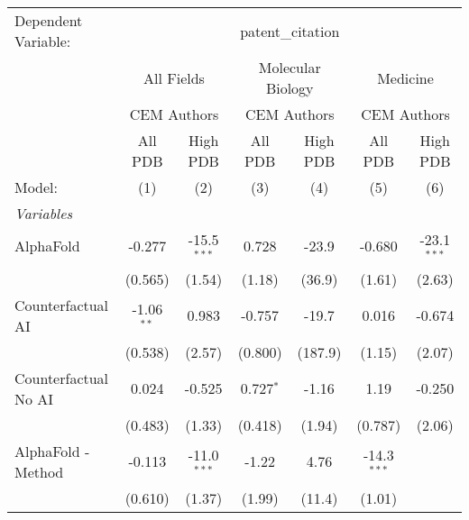 \begingroup
\centering
\begin{tabular}{lcccccc}
   \tabularnewline \midrule \midrule
   Dependent Variable: & \multicolumn{6}{c}{patent\_citation}\\
 & \multicolumn{2}{c}{All Fields} & \multicolumn{2}{c}{Molecular Biology} & \multicolumn{2}{c}{Medicine} \\
\cmidrule(lr){2-3} \cmidrule(lr){4-5} \cmidrule(lr){6-7}
 & \multicolumn{2}{c}{CEM Authors} & \multicolumn{2}{c}{CEM Authors} & \multicolumn{2}{c}{CEM Authors} \\
\cmidrule(lr){2-3} \cmidrule(lr){4-5} \cmidrule(lr){6-7}
 & \multicolumn{1}{c}{All PDB} & \multicolumn{1}{c}{High PDB} & \multicolumn{1}{c}{All PDB} & \multicolumn{1}{c}{High PDB} & \multicolumn{1}{c}{All PDB} & \multicolumn{1}{c}{High PDB} \\
\cmidrule(lr){2-2} \cmidrule(lr){3-3} \cmidrule(lr){4-4} \cmidrule(lr){5-5} \cmidrule(lr){6-6} \cmidrule(lr){7-7}
   Model:                                                     & (1)           & (2)           & (3)           & (4)     & (5)           & (6)\\  
   \midrule
   \emph{Variables}\\
   AlphaFold                                                  & -0.277        & -15.5$^{***}$ & 0.728         & -23.9   & -0.680        & -23.1$^{***}$\\   
                                                              & (0.565)       & (1.54)        & (1.18)        & (36.9)  & (1.61)        & (2.63)\\   
   Counterfactual AI                                          & -1.06$^{**}$  & 0.983         & -0.757        & -19.7   & 0.016         & -0.674\\   
                                                              & (0.538)       & (2.57)        & (0.800)       & (187.9) & (1.15)        & (2.07)\\   
   Counterfactual No AI                                       & 0.024         & -0.525        & 0.727$^{*}$   & -1.16   & 1.19          & -0.250\\   
                                                              & (0.483)       & (1.33)        & (0.418)       & (1.94)  & (0.787)       & (2.06)\\   
   AlphaFold - Method                                         & -0.113        & -11.0$^{***}$ & -1.22         & 4.76    & -14.3$^{***}$ &   \\   
                                                              & (0.610)       & (1.37)        & (1.99)        & (11.4)  & (1.01)        &   \\   

\end{tabular}
